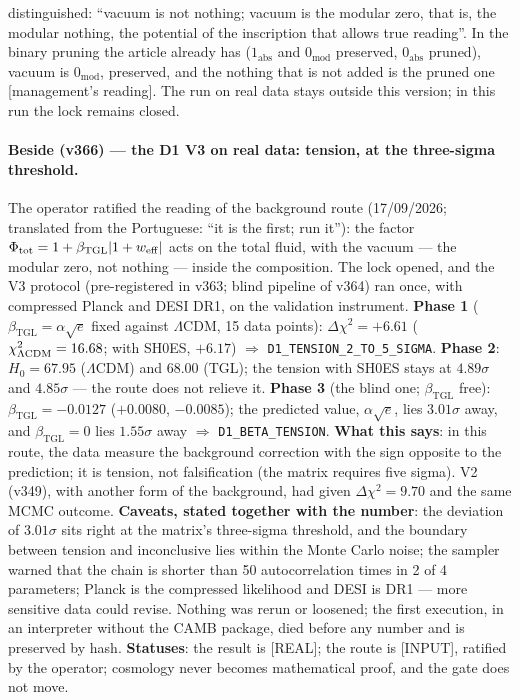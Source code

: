 \documentclass[11pt]{article}
\newcommand{\bTGL}{\beta_{\mathrm{TGL}}}\newcommand{\Msun}{M_{\odot}}\newcommand{\TGL}{\mathrm{TGL}}
\theoremstyle{definition}\newtheorem{deriv}{Derivation}
\begin{document}
distinguished: ``vacuum is not nothing; vacuum is the modular zero, that is, the modular nothing, the potential of the inscription that allows true reading''. In the binary pruning the article already has ($1_{\mathrm{abs}}$ and $0_{\mathrm{mod}}$ preserved, $0_{\mathrm{abs}}$ pruned), vacuum is $0_{\mathrm{mod}}$, preserved, and the nothing that is not added is the pruned one [management's reading]. The run on real data stays outside this version; in this run the lock remains closed.

\paragraph*{Beside (v366) --- the D1 V3 on real data: tension, at the three-sigma threshold.} The operator ratified the reading of the background route (17/09/2026; translated from the Portuguese: ``it is the first; run it''): the factor $\Phi_{\rm tot}=1+\bTGL|1+w_{\rm eff}|$ acts on the total fluid, with the vacuum --- the modular zero, not nothing --- inside the composition. The lock opened, and the V3 protocol (pre-registered in v363; blind pipeline of v364) ran once, with compressed Planck and DESI DR1, on the validation instrument. \textbf{Phase 1} ($\bTGL=\alpha\sqrt e$ fixed against $\Lambda$CDM, 15 data points): $\Delta\chi^2=+6.61$ ($\chi^2_{\Lambda{\rm CDM}}=16.68$; with SH0ES, $+6.17$) $\Rightarrow$ \texttt{D1\_TENSION\_2\_TO\_5\_SIGMA}. \textbf{Phase 2}: $H_0=67.95$ ($\Lambda$CDM) and $68.00$ (TGL); the tension with SH0ES stays at $4.89\sigma$ and $4.85\sigma$ --- the route does not relieve it. \textbf{Phase 3} (the blind one; $\bTGL$ free): $\bTGL=-0.0127$ ($+0.0080$, $-0.0085$); the predicted value, $\alpha\sqrt e$, lies $3.01\sigma$ away, and $\bTGL=0$ lies $1.55\sigma$ away $\Rightarrow$ \texttt{D1\_BETA\_TENSION}. \textbf{What this says}: in this route, the data measure the background correction with the sign opposite to the prediction; it is tension, not falsification (the matrix requires five sigma). V2 (v349), with another form of the background, had given $\Delta\chi^2=9.70$ and the same MCMC outcome. \textbf{Caveats, stated together with the number}: the deviation of $3.01\sigma$ sits right at the matrix's three-sigma threshold, and the boundary between tension and inconclusive lies within the Monte Carlo noise; the sampler warned that the chain is shorter than 50 autocorrelation times in 2 of 4 parameters; Planck is the compressed likelihood and DESI is DR1 --- more sensitive data could revise. Nothing was rerun or loosened; the first execution, in an interpreter without the CAMB package, died before any number and is preserved by hash. \textbf{Statuses}: the result is [REAL]; the route is [INPUT], ratified by the operator; cosmology never becomes mathematical proof, and the gate does not move.
\end{document}

